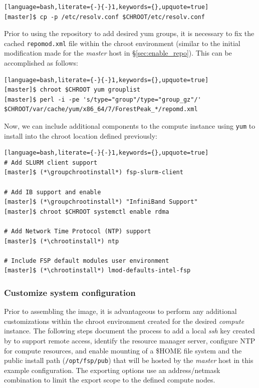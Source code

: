 \documentclass[letterpaper]{article}
\newcommand{\chrootinstall}{yum -y --installroot=\$CHROOT install}
\newcommand{\groupchrootinstall}{yum -y --installroot=\$CHROOT groupinstall}
\begin{document}
\begin{lstlisting}[language=bash,literate={-}{-}1,keywords={},upquote=true]
[master]$ cp -p /etc/resolv.conf $CHROOT/etc/resolv.conf
\end{lstlisting}

Prior to using the \FSP{} repository to add desired yum groups, it is
necessary to fix the cached \texttt{repomod.xml} file within the chroot
environment (similar to the initial modification made for the {\em master} host
in \S\ref{sec:enable_repo}). This can be accomplished as follows:

\begin{lstlisting}[language=bash,literate={-}{-}1,keywords={},upquote=true]
[master]$ chroot $CHROOT yum grouplist
[master]$ perl -i -pe 's/type="group"/type="group_gz"/' $CHROOT/var/cache/yum/x86_64/7/ForestPeak_*/repomd.xml
\end{lstlisting}

Now, we can include additional components to the compute instance using
\texttt{yum} to install into the chroot location defined previously:

\begin{lstlisting}[language=bash,literate={-}{-}1,keywords={},upquote=true]
# Add SLURM client support
[master]$ (*\groupchrootinstall*) fsp-slurm-client

# Add IB support and enable
[master]$ (*\groupchrootinstall*) "InfiniBand Support"
[master]$ chroot $CHROOT systemctl enable rdma

# Add Network Time Protocol (NTP) support
[master]$ (*\chrootinstall*) ntp

# Include FSP default modules user environment
[master]$ (*\chrootinstall*) lmod-defaults-intel-fsp
\end{lstlisting}



\subsubsection{Customize system configuration} \label{sec:master_customization}

Prior to assembling the image, it is advantageous to perform any additional
customizations within the chroot environment created for the desired {\em
  compute} instance. The following steps document the process to add a local
{\em ssh} key created by \Warewulf{} to support remote access, identify the
resource manager server, configure NTP for compute resources, and enable \NFS{}
mounting of a \$HOME file system and the public \FSP{} install path
(\texttt{/opt/fsp/pub}) that will be hosted by the {\em master} host in this
example configuration.  The \NFS{} exporting options use an address/netmask
combination to limit the export scope to the defined compute nodes.
\end{document}
